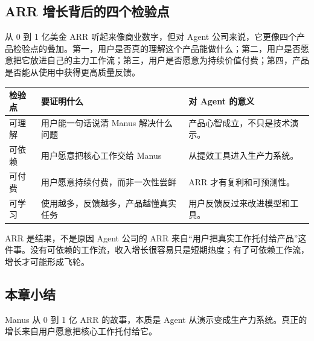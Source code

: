 \subsection{ARR 增长背后的四个检验点}

从 0 到 1 亿美金 ARR 听起来像商业数字，但对 Agent 公司来说，它更像四个产品检验点的叠加。第一，用户是否真的理解这个产品能做什么；第二，用户是否愿意把它放进自己的主力工作流；第三，用户是否愿意为持续价值付费；第四，产品是否能从使用中获得更高质量反馈。

\begin{longtable}{p{}p{}p{}}
\toprule
检验点 & 要证明什么 & 对 Agent 的意义 \\
\midrule
可理解 & 用户能一句话说清 Manus 解决什么问题 & 产品心智成立，不只是技术演示。 \\
可依赖 & 用户愿意把核心工作交给 Manus & 从提效工具进入生产力系统。 \\
可付费 & 用户愿意持续付费，而非一次性尝鲜 & ARR 才有复利和可预测性。 \\
可学习 & 使用越多，反馈越多，产品越懂真实任务 & 用户反馈反过来改进模型和工具。 \\
\bottomrule
\end{longtable}

\begin{importantbox}{ARR 是结果，不是原因}
Agent 公司的 ARR 来自“用户把真实工作托付给产品”这件事。没有可依赖的工作流，收入增长很容易只是短期热度；有了可依赖工作流，增长才可能形成飞轮。
\end{importantbox}

\subsection{本章小结}

Manus 从 0 到 1 亿 ARR 的故事，本质是 Agent 从演示变成生产力系统。真正的增长来自用户愿意把核心工作托付给它。

